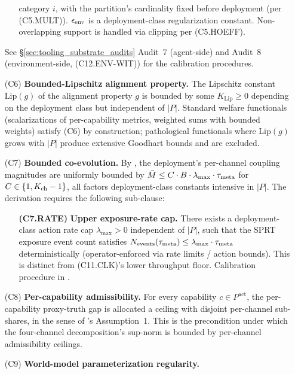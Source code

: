 \begin{theorem}
\begin{enumerate}
\begin{itemize}
    category $i$, with the partition's cardinality fixed before
    deployment (per (C5.MULT)).  $\eenv$ is a deployment-class
    regularization constant.  Non-overlapping support is handled
    via clipping per (C5.HOEFF).
  \end{itemize}
  See \S\ref{sec:tooling_substrate_audits} Audit~7 (agent-side) and
  Audit~8 (environment-side, (C12.ENV-WIT)) for the calibration
  procedures.
\item[(C6)] \textbf{Bounded-Lipschitz alignment property.}  The
  Lipschitz constant $\mathrm{Lip}(g)$ of the alignment property
  $g$ is bounded by some $K_{\mathrm{Lip}} \geq 0$ depending on
  the deployment class but independent of $|P|$.  Standard welfare
  functionals (scalarizations of per-capability metrics, weighted
  sums with bounded weights) satisfy (C6) by construction;
  pathological functionals where $\mathrm{Lip}(g)$ grows with $|P|$
  produce extensive Goodhart bounds and are excluded.
\item[(C7)] \textbf{Bounded co-evolution.}
  By \citep[Theorem~1]{lasser2026foundations}, the deployment's
  per-channel coupling magnitudes are uniformly bounded by
  $\bar{M} \leq C \cdot B \cdot \lambda_{\max} \cdot
  \tau_{\mathrm{meta}}$ for $C \in \{1, K_{\mathrm{ch}} - 1\}$, all factors
  deployment-class constants intensive in $|P|$.  The derivation
  requires the following sub-clause:
  \begin{itemize}
  \item[\textbf{(C7.RATE)}] \textbf{Upper exposure-rate cap.}
    There exists a deployment-class action rate cap
    $\lambda_{\max} > 0$ independent of $|P|$, such that the SPRT
    exposure event count satisfies $N_{\mathrm{events}}(\tau_{\mathrm{meta}})
    \leq \lambda_{\max} \cdot \tau_{\mathrm{meta}}$
    deterministically (operator-enforced via rate limits / action
    bounds).  This is distinct from (C11.CLK)'s lower throughput
    floor.  Calibration procedure in
    \citep[\S 6]{lasser2026foundations}.
  \end{itemize}
\item[(C8)] \textbf{Per-capability admissibility.}  For every
  capability $c \in P^{\mathrm{act}}$, the per-capability proxy-truth gap is
  allocated a ceiling with disjoint per-channel sub-shares, in the sense of
  \citep[Microfoundation]{lasser2026micro}'s Assumption~1.  This is the
  precondition under which the four-channel decomposition's sup-norm is bounded
  by per-channel admissibility ceilings.
\item[(C9)] \textbf{World-model parameterization regularity.}

\end{enumerate}
\end{theorem}
